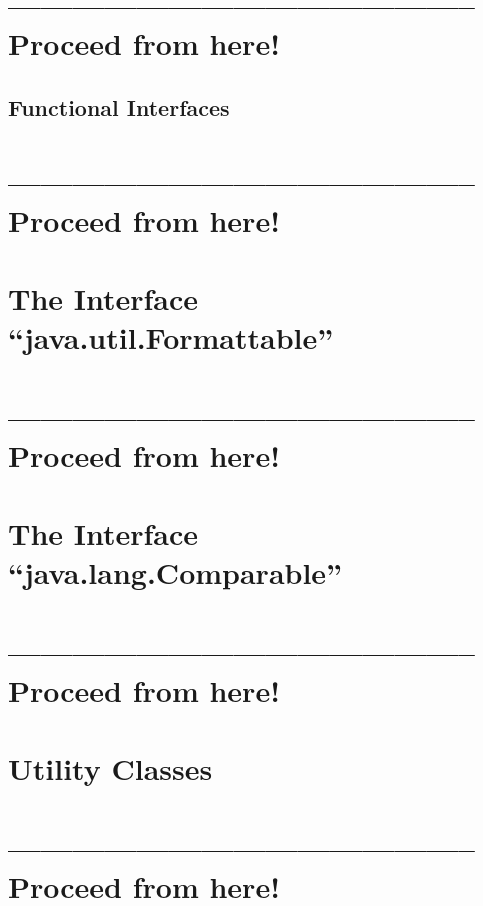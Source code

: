 \documentclass[11pt,a4paper, titlepage, parskip=half, headsepline, footsepline, cleardoublepage=current, headheight=1cm]{scrbook}
\begin{document}
\section{-------------------------------------------- Proceed from here!}
\lipsum[5]

\subsection{Functional Interfaces}\label{sec:FunctionalInterfaces}
\section{-------------------------------------------- Proceed from here!}
\lipsum[5]

\section{The Interface “java.util.Formattable”}\label{sec:FormattableInterface}
\section{-------------------------------------------- Proceed from here!}

\autocite{ORACLE_DOC_STRING_CLASS}
\autocite{ORACLE_DOC_STRINGBUFFER_CLASS}
\autocite{ORACLE_DOC_STRINGBUILDER_CLASS}
\autocite{ORACLE_DOC_STRINGJOINER_CLASS}
\autocite{ORACLE_DOC_FORMATTER_CLASS}
\autocite{ORACLE_DOC_FORMATTABLE_INTERFACE}

\lipsum[1]

\section{The Interface “java.lang.Comparable”}\label{sec:ComparableInterface}
\section{-------------------------------------------- Proceed from here!}
\lipsum[5]

\section{Utility Classes}\label{sec:UtilityClasses}
\section{-------------------------------------------- Proceed from here!}
\lipsum[5]
\end{document}
